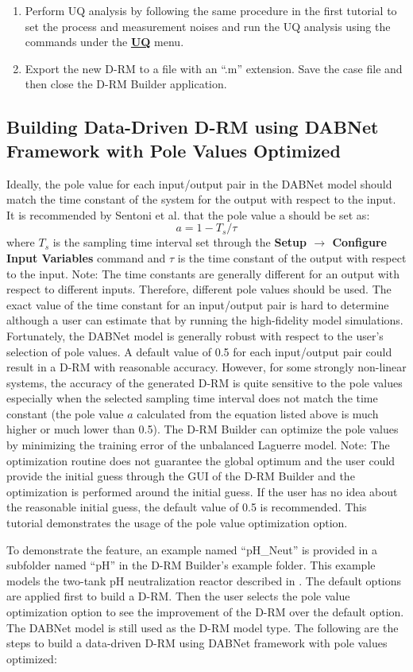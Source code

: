 \begin{enumerate}
	\item Perform UQ analysis by following the same procedure in the first tutorial to set the process and measurement noises and run the UQ analysis using the commands under the \textbf{\underline{UQ}} menu.
	\item Export the new D-RM to a file with an ``.m'' extension.  Save the case file and then close the D-RM Builder application.
\end{enumerate}

\subsection{Building Data-Driven D-RM using DABNet Framework with Pole Values Optimized}
Ideally, the pole value for each input/output pair in the DABNet model should match the time constant of the system for the output with respect to the input.  It is recommended by Sentoni et al. \cite{Sentoni_1998} that the pole value a should be set as:
$$a = 1-T_s/\tau$$
where $T_s$ is the sampling time interval set through the \textbf{Setup $\rightarrow$ Configure Input Variables} command and $\tau$ is the time constant of the output with respect to the input.  Note: The time constants are generally different for an output with respect to different inputs.  Therefore, different pole values should be used.  The exact value of the time constant for an input/output pair is hard to determine although a user can estimate that by running the high-fidelity model simulations.  Fortunately, the DABNet model is generally robust with respect to the user's selection of pole values.  A default value of 0.5 for each input/output pair could result in a D-RM with reasonable accuracy.  However, for some strongly non-linear systems, the accuracy of the generated D-RM is quite sensitive to the pole values especially when the selected sampling time interval does not match the time constant (the pole value $a$ calculated from the equation listed above is much higher or much lower than 0.5).  The D-RM Builder can optimize the pole values by minimizing the training error of the unbalanced Laguerre model.  Note: The optimization routine does not guarantee the global optimum and the user could provide the initial guess through the GUI of the D-RM Builder and the optimization is performed around the initial guess.  If the user has no idea about the reasonable initial guess, the default value of 0.5 is recommended.  This tutorial demonstrates the usage of the pole value optimization option.

To demonstrate the feature, an example named ``pH\_Neut'' is provided in a subfolder named ``pH'' in the D-RM Builder's example folder.  This example models the two-tank pH neutralization reactor described in \cite{Sentoni_1998}.  The default options are applied first to build a D-RM.  Then the user selects the pole value optimization option to see the improvement of the D-RM over the default option.  The DABNet model is still used as the D-RM model type.  The following are the steps to build a 
data-driven D-RM using DABNet framework with pole values optimized:

